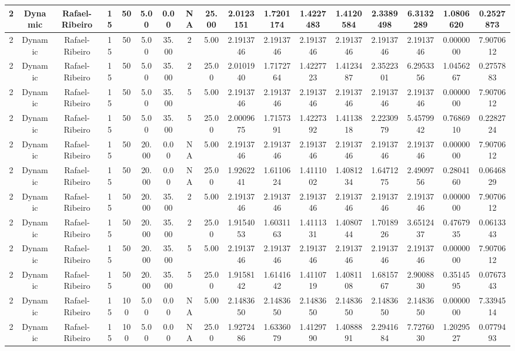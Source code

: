\documentclass[a4paper]{article}
\begin{document}
\begin{center}
\begin{tabular}{ | c | c | c | c | c | c | c | c | c | c | c | c | c | c | c | c | c | }
		2	&	Dynamic	&	Rafael-Ribeiro	&	15	&	50	&	5.00	&	0.00	&	NA	&	25.00	&	2.0123151	&	1.7201174	&	1.4227483	&	1.4120584	&	2.3389498	&	6.3132289	&	1.0806620	&	0.2527873 \\
		\hline
		2	&	Dynamic	&	Rafael-Ribeiro	&	15	&	50	&	5.00	&	35.00	&	2	&	5.00	&	2.1913746	&	2.1913746	&	2.1913746	&	2.1913746	&	2.1913746	&	2.1913746	&	0.0000000	&	7.9070612 \\
		\hline
		2	&	Dynamic	&	Rafael-Ribeiro	&	15	&	50	&	5.00	&	35.00	&	2	&	25.00	&	2.0101940	&	1.7172764	&	1.4227723	&	1.4123487	&	2.3522301	&	6.2953356	&	1.0456267	&	0.2757883 \\
		\hline
		2	&	Dynamic	&	Rafael-Ribeiro	&	15	&	50	&	5.00	&	35.00	&	5	&	5.00	&	2.1913746	&	2.1913746	&	2.1913746	&	2.1913746	&	2.1913746	&	2.1913746	&	0.0000000	&	7.9070612 \\
		\hline
		2	&	Dynamic	&	Rafael-Ribeiro	&	15	&	50	&	5.00	&	35.00	&	5	&	25.00	&	2.0009675	&	1.7157391	&	1.4227392	&	1.4113818	&	2.2230979	&	5.4579942	&	0.7686910	&	0.2282724 \\
		\hline
		2	&	Dynamic	&	Rafael-Ribeiro	&	15	&	50	&	20.00	&	0.00	&	NA	&	5.00	&	2.1913746	&	2.1913746	&	2.1913746	&	2.1913746	&	2.1913746	&	2.1913746	&	0.0000000	&	7.9070612 \\
		\hline
		2	&	Dynamic	&	Rafael-Ribeiro	&	15	&	50	&	20.00	&	0.00	&	NA	&	25.00	&	1.9262241	&	1.6110624	&	1.4111002	&	1.4081234	&	1.6471275	&	2.4909756	&	0.2804160	&	0.0646829 \\
		\hline
		2	&	Dynamic	&	Rafael-Ribeiro	&	15	&	50	&	20.00	&	35.00	&	2	&	5.00	&	2.1913746	&	2.1913746	&	2.1913746	&	2.1913746	&	2.1913746	&	2.1913746	&	0.0000000	&	7.9070612 \\
		\hline
		2	&	Dynamic	&	Rafael-Ribeiro	&	15	&	50	&	20.00	&	35.00	&	2	&	25.00	&	1.9154053	&	1.6031163	&	1.4111331	&	1.4080744	&	1.7018926	&	3.6512437	&	0.4767935	&	0.0613343 \\
		\hline
		2	&	Dynamic	&	Rafael-Ribeiro	&	15	&	50	&	20.00	&	35.00	&	5	&	5.00	&	2.1913746	&	2.1913746	&	2.1913746	&	2.1913746	&	2.1913746	&	2.1913746	&	0.0000000	&	7.9070612 \\
		\hline
		2	&	Dynamic	&	Rafael-Ribeiro	&	15	&	50	&	20.00	&	35.00	&	5	&	25.00	&	1.9158142	&	1.6141642	&	1.4110719	&	1.4081108	&	1.6815767	&	2.9008830	&	0.3514595	&	0.0767343 \\
		\hline
		2	&	Dynamic	&	Rafael-Ribeiro	&	15	&	100	&	5.00	&	0.00	&	NA	&	5.00	&	2.1483650	&	2.1483650	&	2.1483650	&	2.1483650	&	2.1483650	&	2.1483650	&	0.0000000	&	7.3394514 \\
		\hline
		2	&	Dynamic	&	Rafael-Ribeiro	&	15	&	100	&	5.00	&	0.00	&	NA	&	25.00	&	1.9272486	&	1.6336079	&	1.4129790	&	1.4088891	&	2.2941684	&	7.7276030	&	1.2029527	&	0.0779493 \\

\end{tabular}
\end{center}
\end{document}

